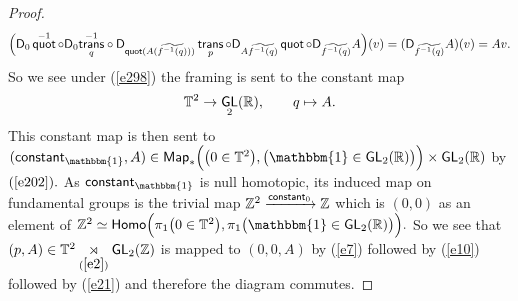 \documentclass{amsart}
\theoremstyle{definition}
\theoremstyle{remark}
\DeclareMathOperator{\Map}{{\sf Map}}
\newcommand{\xra}{\xrightarrow}
\DeclareMathOperator{\uno}{\mathbbm{1}}
\DeclareMathOperator{\GL}{\sf GL}
\DeclareMathOperator{\quot}{\sf quot}
\DeclareMathOperator{\trans}{\sf trans}
\begin{document}
\begin{proof}
$$\Big(\sD_{0}\quot^{-1} \circ \sD_{0}{\trans_{q}^{-1}} \circ \sD_{\quot(A(\widetilde{f^{-1}(q)}))} \trans_{p} \circ \sD_{A\widetilde{f^{-1}(q)}} \quot \circ \sD_{\widetilde{f^{-1}(q)}} A \Big) (v)=  (\sD_{\widetilde{f^{-1}(q)}}A)(v) = Av.$$ 
So we see under (\ref{e298}) the framing is sent to the constant map $$\TT^{2} \rightarrow \GL_{2}(\RR), \qquad q \mapsto A.$$
This constant map is then sent to $({\sf constant}_{\uno}, A) \in \Map_\ast \Bigl( \bigl( 0 \in \TT^2 \bigr) , \bigl( \uno \in \GL_2(\RR) \bigr) \Bigr) \times \GL_2(\RR)$ by $(\ref{e202}).$ As ${\sf constant}_{\uno}$ is null homotopic, its induced map on fundamental groups is the trivial map $\ZZ^{2} \xra{{\sf constant}_{0}} \ZZ$ which is $(0,0)$ as an element of $\ZZ^{2} \simeq {\sf Homo}\Bigl( \pi_1\bigl( 0 \in \TT^2 \bigr) , \pi_1\bigl( \uno \in \GL_2(\RR) \bigr) \Bigr).$
\newline \newline So we see that $(p, A) \in \TT^2 \underset{(\ref{e2})}\rtimes \GL_2(\ZZ)$ is mapped to $(0, 0, A)$ by (\ref{e7}) followed by (\ref{e10}) followed by (\ref{e21}) and therefore the diagram commutes.
\end{proof} 
\end{document}
